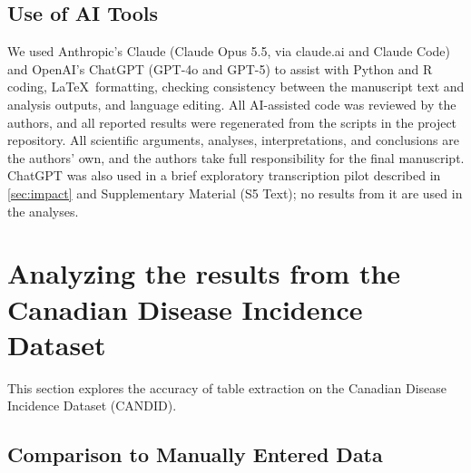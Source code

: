 \documentclass[12pt]{article}
\begin{document}
\subsection{Use of AI Tools}\label{sec:ai-disclosure}
We used Anthropic's Claude (Claude Opus 5.5, via claude.ai and Claude Code) and OpenAI's ChatGPT (GPT-4o and GPT-5) to assist with Python and R coding, \LaTeX\ formatting, checking consistency between the manuscript text and analysis outputs, and language editing. All AI-assisted code was reviewed by the authors, and all reported results were regenerated from the scripts in the project repository. All scientific arguments, analyses, interpretations, and conclusions are the authors' own, and the authors take full responsibility for the final manuscript. ChatGPT was also used in a brief exploratory transcription pilot described in \cref{sec:impact} and Supplementary Material (S5 Text); no results from it are used in the analyses.

\section{Analyzing the results from the Canadian Disease Incidence Dataset} \label{sec:NDD}
This section explores the accuracy of table extraction on the Canadian Disease Incidence Dataset (CANDID).


\subsection{Comparison to Manually Entered Data}
\end{document}
